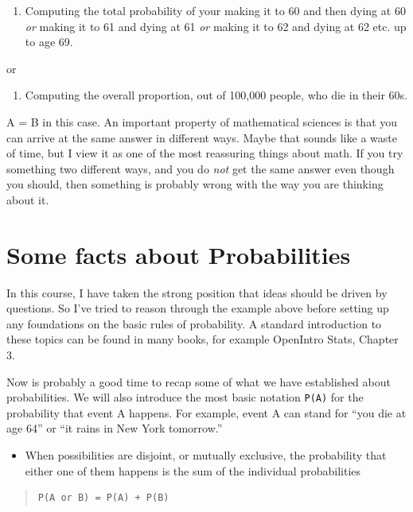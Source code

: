 \documentclass[
  openany]{book}
\providecommand{\tightlist}{%
  \setlength{\itemsep}{0pt}\setlength{\parskip}{0pt}}
\begin{document}
\begin{enumerate}
\def\labelenumi{\Alph{enumi})}
\tightlist
\item
  Computing the total probability of your making it to 60 and then dying at 60 \emph{or} making it to 61 and dying at 61 \emph{or} making it to 62 and dying at 62 etc. up to age 69.
\end{enumerate}

or

\begin{enumerate}
\def\labelenumi{\Alph{enumi})}
\setcounter{enumi}{1}
\tightlist
\item
  Computing the overall proportion, out of 100,000 people, who die in their 60s.
\end{enumerate}

A = B in this case. An important property of mathematical sciences is that you can arrive at the same answer in different ways. Maybe that sounds like a waste of time, but I view it as one of the most reassuring things about math. If you try something two different ways, and you do \emph{not} get the same answer even though you should, then something is probably wrong with the way you are thinking about it.

\hypertarget{somefacts}{%
\chapter{Some facts about Probabilities}\label{somefacts}}

In this course, I have taken the strong position that ideas should be driven by questions. So I've tried to reason through the example above before setting up any foundations on the basic rules of probability. A standard introduction to these topics can be found in many books, for example OpenIntro Stats, Chapter 3.

Now is probably a good time to recap some of what we have established about probabilities. We will also introduce the most basic notation \texttt{P(A)} for the probability that event A happens. For example, event A can stand for ``you die at age 64'' or ``it rains in New York tomorrow.''

\begin{itemize}
\tightlist
\item
  When possibilities are disjoint, or mutually exclusive, the probability that either one of them happens is the sum of the individual probabilities
\end{itemize}

\begin{quote}
\begin{verbatim}
P(A or B) = P(A) + P(B)
\end{verbatim}
\end{quote}
\end{document}
